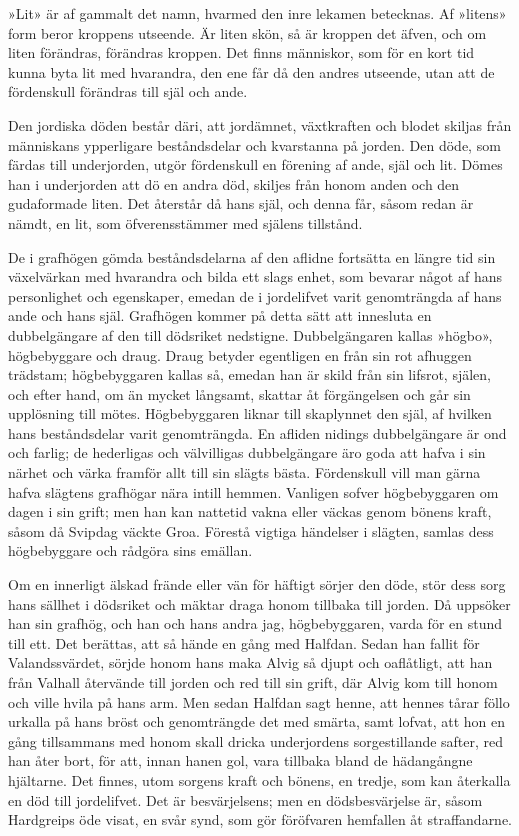 »Lit» är af gammalt det namn, hvarmed den inre lekamen betecknas. Af
»litens» form beror kroppens utseende. Är liten skön, så är kroppen det
äfven, och om liten förändras, förändras kroppen. Det finns människor,
som för en kort tid kunna byta lit med hvarandra, den ene får då den
andres utseende, utan att de fördenskull förändras till själ och ande.

Den jordiska döden består däri, att jordämnet, växtkraften och blodet
skiljas från människans ypperligare beståndsdelar och kvarstanna på
jorden. Den döde, som färdas till underjorden, utgör fördenskull en
förening af ande, själ och lit. Dömes han i underjorden att dö en andra
död, skiljes från honom anden och den gudaformade liten. Det återstår då
hans själ, och denna får, såsom redan är nämdt, en lit, som
öfverensstämmer med själens tillstånd.

De i grafhögen gömda beståndsdelarna af den aflidne fortsätta en längre
tid sin växelvärkan med hvarandra och bilda ett slags enhet, som bevarar
något af hans personlighet och egenskaper, emedan de i jordelifvet varit
genomträngda
af hans ande och hans själ. Grafhögen kommer på detta sätt att innesluta
en dubbelgängare af den till dödsriket nedstigne. Dubbelgängaren kallas
»högbo», högbebyggare och draug. Draug betyder egentligen en från sin
rot afhuggen trädstam; högbebyggaren kallas så, emedan han är skild från
sin lifsrot, själen, och efter hand, om än mycket långsamt, skattar åt
förgängelsen och går sin upplösning till mötes. Högbebyggaren liknar
till skaplynnet den själ, af hvilken hans beståndsdelar varit
genomträngda. En afliden nidings dubbelgängare är ond och farlig; de
hederligas och välvilligas dubbelgängare äro goda att hafva i sin närhet
och värka framför allt till sin slägts bästa. Fördenskull vill man gärna
hafva slägtens grafhögar nära intill hemmen. Vanligen sofver
högbebyggaren om dagen i sin grift; men han kan nattetid vakna eller
väckas genom bönens kraft, såsom då Svipdag väckte Groa. Förestå vigtiga
händelser i slägten, samlas dess högbebyggare och rådgöra sins emällan.

Om en innerligt älskad frände eller vän för häftigt sörjer den döde,
stör dess sorg hans sällhet i dödsriket och mäktar draga honom tillbaka
till jorden. Då uppsöker han sin grafhög, och han och hans andra jag,
högbebyggaren, varda för en stund till ett. Det berättas, att så hände
en gång med Halfdan. Sedan han fallit för Valandssvärdet, sörjde honom
hans maka Alvig så djupt och oaflåtligt, att han från Valhall återvände
till jorden och red till sin grift, där Alvig kom till honom och ville
hvila på hans arm. Men sedan Halfdan sagt henne, att hennes tårar föllo
urkalla på hans bröst och genomträngde det med smärta, samt lofvat, att
hon en gång tillsammans med honom skall dricka underjordens
sorgestillande safter, red han åter bort, för att, innan hanen gol, vara
tillbaka bland de hädangångne hjältarne. Det finnes, utom sorgens kraft
och bönens, en tredje, som kan återkalla en död till jordelifvet. Det är
besvärjelsens; men en dödsbesvärjelse är, såsom Hardgreips öde visat, en
svår synd, som gör föröfvaren hemfallen åt straffandarne.



